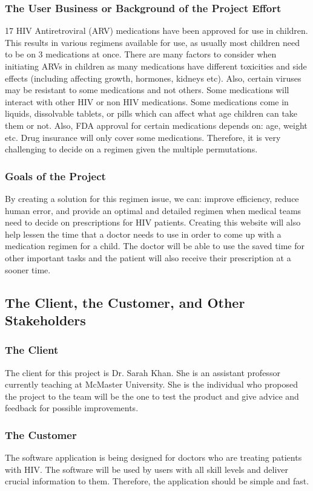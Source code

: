 \documentclass[12pt]{article}
\begin{document}
\subsubsection{The User Business or Background of the Project Effort}
17 HIV Antiretroviral (ARV) medications have been approved for use in children. This results in various regimens available for use, as usually most children need to be on 3 medications at once. There are many factors to consider when initiating ARVs in children as many medications have different toxicities and side effects (including affecting growth, hormones, kidneys etc). Also, certain viruses may be resistant to some medications and not others. Some medications will interact with other HIV or non HIV medications. Some medications come in liquids, dissolvable tablets, or pills which can affect what age children can take them or not. Also, FDA approval for certain medications depends on: age, weight etc. Drug insurance will only cover some medications. Therefore, it is very challenging to decide on a regimen given the multiple permutations.
\subsubsection{Goals of the Project}
By creating a solution for this regimen issue, we can: improve efficiency, reduce human error, and provide an optimal and detailed regimen when medical teams need to decide on prescriptions for HIV patients. Creating this website will also help lessen the time that a doctor needs to use in order to come up with a medication regimen for a child. The doctor will be able to use the saved time for other important tasks and the patient will also receive their prescription at a sooner time.

\subsection{The Client, the Customer, and Other Stakeholders}
\subsubsection{The Client}
The client for this project is Dr. Sarah Khan. She is an assistant professor currently teaching at McMaster University. She is the individual who proposed the project to the team will be the one to test the product and give advice and feedback for possible improvements.
\subsubsection{The Customer}
The software application is being designed for doctors who are treating patients with HIV. The software will be used by users with all skill levels and deliver crucial information to them. Therefore, the application should be simple and fast.
\end{document}
